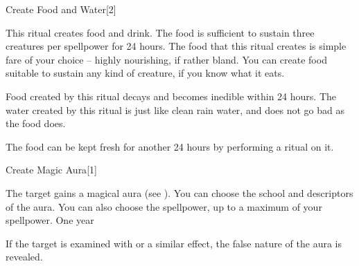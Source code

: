 \begin{spellsection}{Create Food and Water}[2]
    \begin{spellheader}
    \end{spellheader}
    \begin{spellcontent}
        \begin{spelltargetinginfo}
            \spellrng{\rngclose}
        \end{spelltargetinginfo}
        \begin{spelleffects}

            \spellline
            \spelleffect This ritual creates food and drink. The food is sufficient to sustain three creatures per spellpower for 24 hours. The food that this ritual creates is simple fare of your choice -- highly nourishing, if rather bland. You can create food suitable to sustain any kind of creature, if you know what it eats.

            Food created by this ritual decays and becomes inedible within 24 hours. The water created by this ritual is just like clean rain water, and does not go bad as the food does.
        \end{spelleffects}
    \end{spellcontent}
    \begin{spellfooter}
        \spellnotes The food can be kept fresh for another 24 hours by performing a  ritual on it.
    \end{spellfooter}
\end{spellsection}

\begin{spellsection}{Create Magic Aura}[1]
    \begin{spellheader}
    \end{spellheader}
    \begin{spellcontent}
        \begin{spelltargetinginfo}
        \end{spelltargetinginfo}
        \begin{spelleffects}

            \spelleffect The target gains a magical aura (see ). You can choose the school and descriptors of the aura. You can also choose the spellpower, up to a maximum of your spellpower.
            \spelldur One year \dismissable
        \end{spelleffects}
    \end{spellcontent}
    \begin{spellfooter}
        \spellnotes If the target is examined with  or a similar effect, the false nature of the aura is revealed.
    \end{spellfooter}
\end{spellsection}

